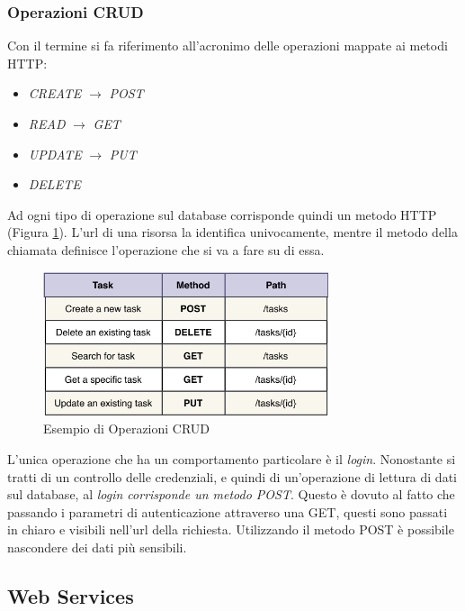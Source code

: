 \subsubsection{Operazioni CRUD}
Con il termine si fa riferimento all'acronimo delle operazioni mappate ai metodi HTTP:
\begin{itemize}
    \item \textit{CREATE} $\rightarrow$ \textit{POST} 
    \item \textit{READ} $\rightarrow$  \textit{GET} 
    \item \textit{UPDATE} $\rightarrow$ \textit{PUT}
    \item \textit{DELETE}
\end{itemize}

Ad ogni tipo di operazione sul database corrisponde quindi un metodo HTTP (Figura \ref{fig:crudoperations}). L'url di una risorsa la identifica univocamente, mentre il metodo della chiamata definisce l'operazione che si va a fare su di essa.

\begin{figure}[H]
    \centering
    \includegraphics[width=0.75\textwidth]{images/01_11_rest_crud.pdf}
    \caption{Esempio di Operazioni CRUD}
    \label{fig:crudoperations}
\end{figure}

L'unica operazione che ha un comportamento particolare è il \emph{login}. Nonostante si tratti di un controllo delle credenziali, e quindi di un'operazione di lettura di dati sul database, al \textit{login corrisponde un metodo POST}. Questo è dovuto al fatto che passando i parametri di autenticazione attraverso una GET, questi sono passati in chiaro e visibili nell'url della richiesta. Utilizzando il metodo POST è possibile nascondere dei dati più sensibili.

\subsection{Web Services}
